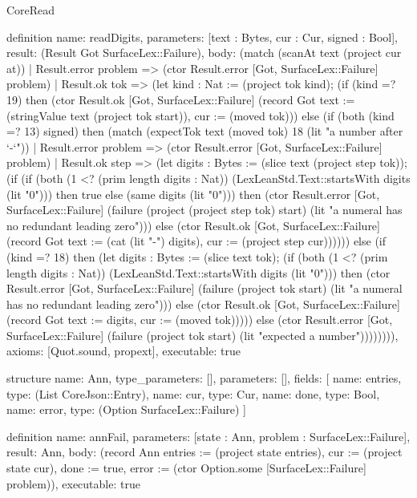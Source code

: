 \begin{lexlean}{CoreRead}
\begin{semanticmodule}
definition{
  name: readDigits,
  parameters: [text : Bytes, cur : Cur, signed : Bool],
  result: (Result Got SurfaceLex::Failure),
  body: (match (scanAt text (project cur at))
    | Result.error problem => (ctor Result.error [Got, SurfaceLex::Failure] problem)
    | Result.ok tok => (let kind : Nat := (project tok kind); (if (kind =? 19) then (ctor Result.ok [Got, SurfaceLex::Failure] (record Got {text := (stringValue text (project tok start)), cur := (moved tok)})) else (if (both (kind =? 13) signed) then (match (expectTok text (moved tok) 18 (lit "a number after `-`"))
      | Result.error problem => (ctor Result.error [Got, SurfaceLex::Failure] problem)
      | Result.ok step => (let digits : Bytes := (slice text (project step tok)); (if (if (both (1 <? (prim length digits : Nat)) (LexLeanStd.Text::startsWith digits (lit "0"))) then true else (same digits (lit "0"))) then (ctor Result.error [Got, SurfaceLex::Failure] (failure (project (project step tok) start) (lit "a numeral has no redundant leading zero"))) else (ctor Result.ok [Got, SurfaceLex::Failure] (record Got {text := (cat (lit "-") digits), cur := (project step cur)}))))) else (if (kind =? 18) then (let digits : Bytes := (slice text tok); (if (both (1 <? (prim length digits : Nat)) (LexLeanStd.Text::startsWith digits (lit "0"))) then (ctor Result.error [Got, SurfaceLex::Failure] (failure (project tok start) (lit "a numeral has no redundant leading zero"))) else (ctor Result.ok [Got, SurfaceLex::Failure] (record Got {text := digits, cur := (moved tok)})))) else (ctor Result.error [Got, SurfaceLex::Failure] (failure (project tok start) (lit "expected a number")))))))),
  axioms: [Quot.sound, propext],
  executable: true
}

structure{
  name: Ann,
  type_parameters: [],
  parameters: [],
  fields: [
    {name: entries, type: (List CoreJson::Entry)},
    {name: cur, type: Cur},
    {name: done, type: Bool},
    {name: error, type: (Option SurfaceLex::Failure)}
  ]
}

definition{
  name: annFail,
  parameters: [state : Ann, problem : SurfaceLex::Failure],
  result: Ann,
  body: (record Ann {entries := (project state entries), cur := (project state cur), done := true, error := (ctor Option.some [SurfaceLex::Failure] problem)}),
  executable: true
}


\end{semanticmodule}
\end{lexlean}
